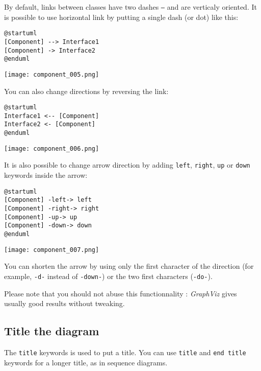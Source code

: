 By default, links between classes have two dashes \texttt{--}
 and are verticaly oriented. It is possible to use horizontal link by putting a
 single dash (or dot) like this:

\begin{lstlisting}
@startuml
[Component] --> Interface1
[Component] -> Interface2
@enduml
\end{lstlisting}

\begin{center}
\texttt{[image: component\_005.png]}
\end{center}

You can also change directions by reversing the link:

\begin{lstlisting}
@startuml
Interface1 <-- [Component]
Interface2 <- [Component]
@enduml
\end{lstlisting}

\begin{center}
\texttt{[image: component\_006.png]}
\end{center}

It is also possible to change arrow direction by adding \texttt{left},
\texttt{right}, \texttt{up} or \texttt{down} keywords inside the arrow:

\begin{lstlisting}
@startuml
[Component] -left-> left 
[Component] -right-> right 
[Component] -up-> up
[Component] -down-> down
@enduml
\end{lstlisting}

\begin{center}
\texttt{[image: component\_007.png]}
\end{center}

You can shorten the arrow by using only the first character of the direction
(for example, \texttt{-d-} instead of \texttt{-down-}) or the two first
characters (\texttt{-do-}).

Please note that you should not abuse this functionnality : \textit{GraphViz}
gives usually good results without tweaking.

\subsection{Title the diagram}

The \texttt{title} keywords is used to put a title.
You can use \texttt{title} and \texttt{end title} keywords for a longer title,
as in sequence diagrams.

